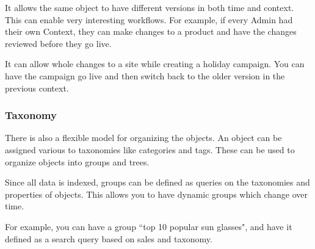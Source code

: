 \documentclass[11pt]{article}
\begin{document}
It allows the same object to have different versions in both time and context.
This can enable very interesting workflows. For example, if every Admin
had their own Context, they can make changes to a product and have the changes
reviewed before they go live.

It can allow whole changes to a site while creating a holiday campaign.
You can have the campaign go live and then switch back to the older version in
the previous context.

\subsubsection{Taxonomy}

There is also a flexible model for organizing the objects. An object can be assigned
various to taxonomies like categories and tags. These can be used to organize objects
into groups and trees.

Since all data is indexed, groups can be defined as queries on the taxonomies and
properties of objects. This allows you to have dynamic groups which change over time.

For example, you can have a group ``top 10 popular sun glasses", and have it
defined as a search query based on sales and taxonomy.
\end{document}
